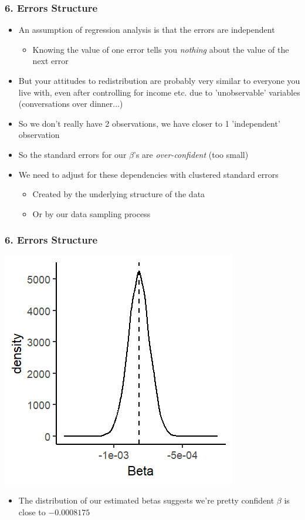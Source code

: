 \documentclass[xcolor=x11names,compress]{beamer}\usepackage[]{graphicx}\usepackage[]{color}
\makeatletter
\def\maxwidth{ %
  \ifdim\Gin@nat@width>\linewidth
    \linewidth
  \else
    \Gin@nat@width
  \fi
}
\newenvironment{knitrout}{}{} %
\renewcommand{\(}{\begin{columns}}
\renewcommand{\)}{\end{columns}}
\newcommand{\<}[1]{\begin{column}{#1}}
\renewcommand{\>}{\end{column}}
\makeatother
\begin{document}
\begin{frame}
\frametitle{6. Errors Structure}
\begin{itemize}
\item An assumption of regression analysis is that the errors are independent
\begin{itemize}
\item Knowing the value of one error tells you \textit{nothing} about the value of the next error
\end{itemize}
\item But your attitudes to redistribution are probably very similar to everyone you live with, even after controlling for income etc. due to 'unobservable' variables (conversations over dinner...)
\pause
\item So we don't really have 2 observations, we have closer to 1 'independent' observation
\item So the standard errors for our $\beta$'s are \textit{over-confident} (too small)
\pause
\item We need to adjust for these dependencies with clustered standard errors
\begin{itemize}
\item Created by the underlying structure of the data
\item Or by our data sampling process
\end{itemize}
\end{itemize}
\end{frame}

\begin{frame}
\frametitle{6. Errors Structure}
\begin{multicols}{2}
\begin{knitrout}
\color{fgcolor}
\includegraphics[width=\maxwidth]{figure/beta_dist_errors_4-1} 

\end{knitrout}
\columnbreak
\begin{itemize}
\item The distribution of our estimated betas suggests we're pretty confident $\beta$ is close to $-0.0008175$
\end{itemize}
\end{multicols}
\end{frame}
\end{document}
